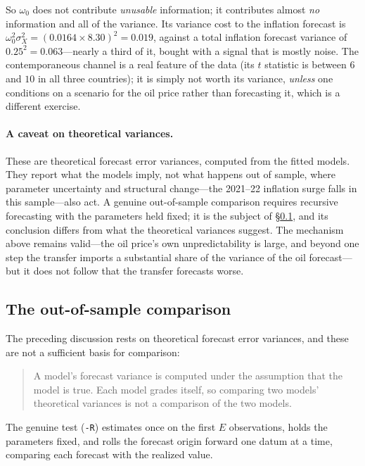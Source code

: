 \documentclass[11pt,a4paper]{article}
\theoremstyle{plain}
\theoremstyle{remark}
\begin{document}
So $\omega_0$ does not contribute \emph{unusable} information; it contributes
almost \emph{no} information and all of the variance. Its variance cost to the
inflation forecast is $\omega_0^2\sigma_X^2 = (0.0164\times 8.30)^2 = 0.019$,
against a total inflation forecast variance of $0.25^2=0.063$---nearly a third of
it, bought with a signal that is mostly noise. The contemporaneous channel is a
real feature of the data (its $t$ statistic is between $6$ and $10$ in all three
countries); it is simply not worth its variance, \emph{unless} one conditions on a
scenario for the oil price rather than forecasting it, which is a different
exercise.

\paragraph{A caveat on theoretical variances.} These are theoretical forecast
error variances, computed from the fitted models. They report what the models
imply, not what happens out of sample, where parameter uncertainty and structural
change---the 2021--22 inflation surge falls in this sample---also act. A genuine
out-of-sample comparison requires recursive forecasting with the parameters held
fixed; it is the subject of \S\ref{sec:recursive}, and its conclusion differs from
what the theoretical variances suggest. The mechanism above remains valid---the oil
price's own unpredictability is large, and beyond one step the transfer imports a
substantial share of the variance of the oil forecast---but it does not follow that
the transfer forecasts worse.


\subsection{The out-of-sample comparison}
\label{sec:recursive}

The preceding discussion rests on theoretical forecast error variances, and these
are not a sufficient basis for comparison:

\begin{quote}
A model's forecast variance is computed under the assumption that the model is
true. Each model grades itself, so comparing two models' theoretical variances is
not a comparison of the two models.
\end{quote}

The genuine test (\texttt{-R}) estimates once on the first $E$ observations, holds
the parameters fixed, and rolls the forecast origin forward one datum at a time,
comparing each forecast with the realized value.
\end{document}
